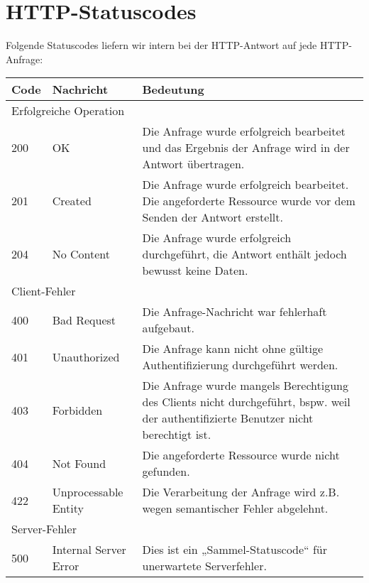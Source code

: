 \documentclass[a4paper]{scrreprt}
\begin{document}
	\section{HTTP-Statuscodes}
	Folgende Statuscodes liefern wir intern bei der HTTP-Antwort auf jede HTTP-Anfrage:
	\begin{flushleft}
		\begin{tabular}{|p{}|p{}|p{}|}
		\hline
		\textbf{Code} & \textbf{Nachricht} & \textbf{Bedeutung} \\
		\hline
		\multicolumn{3}{|l|}{Erfolgreiche Operation} \\
		\hline
		200 & OK & Die Anfrage wurde erfolgreich bearbeitet und das Ergebnis der Anfrage wird in der Antwort übertragen. \\
		201 & Created & Die Anfrage wurde erfolgreich bearbeitet. Die angeforderte Ressource wurde vor dem Senden der Antwort erstellt. \\
		204 & No Content & Die Anfrage wurde erfolgreich durchgeführt, die Antwort enthält jedoch bewusst keine Daten. \\
		\hline
		\multicolumn{3}{|l|}{Client-Fehler} \\
		\hline
		400 & Bad Request & Die Anfrage-Nachricht war fehlerhaft aufgebaut. \\
		401 & Unauthorized & Die Anfrage kann nicht ohne gültige Authentifizierung durchgeführt werden. \\
		403 & Forbidden & Die Anfrage wurde mangels Berechtigung des Clients nicht durchgeführt, bspw. weil der authentifizierte Benutzer nicht berechtigt ist. \\
		404 & Not Found & Die angeforderte Ressource wurde nicht gefunden. \\
		422 & Unprocessable Entity & Die Verarbeitung der Anfrage wird z.B. wegen semantischer Fehler abgelehnt. \\
		\hline
		\multicolumn{3}{|l|}{Server-Fehler} \\
		\hline
		500 & Internal Server Error & Dies ist ein „Sammel-Statuscode“ für unerwartete Serverfehler. \\
		\hline	
		\end{tabular}
	\end{flushleft}
\end{document}
